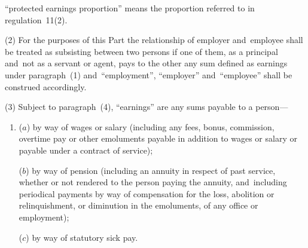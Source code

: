 \documentclass[12pt,a4paper]{article}
\begin{document}
\begin{enumerate}
“protected earnings proportion” means the proportion referred to in regulation~11(2).



\end{enumerate}

(2) For the purposes of this Part the relationship of employer and~employee shall be treated as subsisting between two persons if one of them, as a principal and~not as a servant or agent, pays to the other any sum defined as earnings under paragraph~(1) and~“employment”, “employer” and~“employee” shall be construed accordingly.

(3) Subject to paragraph~(4), “earnings” are any sums payable to a person—
\begin{enumerate}\item[]
($a$) by way of wages or salary (including any fees, bonus, commission, overtime pay or other emoluments payable in addition to wages or salary or payable under a contract of service);

($b$) by way of pension (including an annuity in respect of past service, whether or not rendered to the person paying the annuity, and~including periodical payments by way of compensation for the loss, abolition or relinquishment, or diminution in the emoluments, of any office or employment);

($c$) by way of statutory sick pay.
\end{enumerate}
\end{document}
